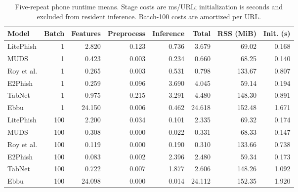 \documentclass[10pt]{article}
\begin{document}
\begin{table}[ht]
\centering\color{black}\small
\caption{Five-repeat phone runtime means. Stage costs are ms/URL; initialization is seconds and excluded from resident inference. Batch-100 costs are amortized per URL.}

\begin{tabular}{lrrrrrrr}
\toprule
Model & Batch & Features & Preprocess & Inference & Total & RSS (MiB) & Init. (s) \\
\midrule
LitePhish & 1 & 2.820 & 0.123 & 0.736 & 3.679 & 69.02 & 0.168 \\
MUDS & 1 & 0.423 & 0.003 & 0.234 & 0.660 & 68.25 & 0.140 \\
Roy et al. & 1 & 0.265 & 0.003 & 0.531 & 0.798 & 133.67 & 0.807 \\
E2Phish & 1 & 0.259 & 0.096 & 3.690 & 4.045 & 59.14 & 0.194 \\
TabNet & 1 & 0.975 & 0.215 & 3.291 & 4.480 & 148.30 & 0.891 \\
Ebbu & 1 & 24.150 & 0.006 & 0.462 & 24.618 & 152.48 & 1.671 \\
LitePhish & 100 & 2.200 & 0.034 & 0.101 & 2.335 & 69.32 & 0.174 \\
MUDS & 100 & 0.308 & 0.000 & 0.022 & 0.331 & 68.33 & 0.147 \\
Roy et al. & 100 & 0.119 & 0.000 & 0.190 & 0.310 & 133.66 & 0.738 \\
E2Phish & 100 & 0.083 & 0.002 & 2.396 & 2.480 & 59.34 & 0.173 \\
TabNet & 100 & 0.722 & 0.007 & 1.877 & 2.606 & 148.26 & 1.092 \\
Ebbu & 100 & 24.098 & 0.000 & 0.014 & 24.112 & 152.35 & 1.920 \\
\bottomrule
\end{tabular}
\end{table}
\end{document}
